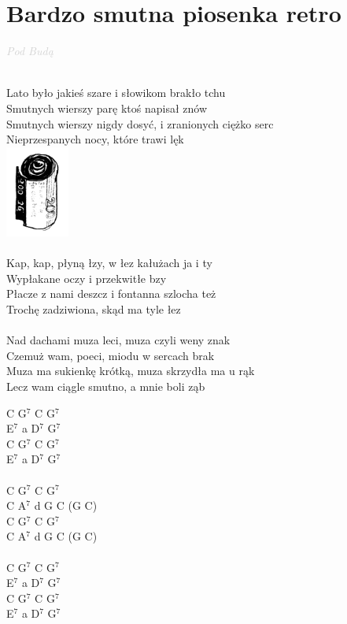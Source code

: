 \documentclass[a5paper, 10pt]{book}
\begin{document}
\newpage
\section{Bardzo smutna piosenka retro}\textcolor{lightgray}{\textit{Pod Budą}}\\~\\
\begin{minipage}[t]{0.8\textwidth}
Lato było jakieś szare i słowikom brakło tchu\\
Smutnych wierszy parę ktoś napisał znów\\
Smutnych wierszy nigdy dosyć, i zranionych ciężko serc\\
Nieprzespanych nocy, które trawi lęk\\
\includegraphics[height=3cm,right]{images/bardzo_smutna_piosenka.png}\vspace*{-31mm}\\
\\
\hspace*{5mm}Kap, kap, płyną łzy, w łez kałużach ja i ty\\
\hspace*{5mm}Wypłakane oczy i przekwitłe bzy\\
\hspace*{5mm}Płacze z nami deszcz i fontanna szlocha też\\
\hspace*{5mm}Trochę zadziwiona, skąd ma tyle łez\\
\\
Nad dachami muza leci, muza czyli weny znak\\
Czemuż wam, poeci, miodu w sercach brak\\
Muza ma sukienkę krótką, muza skrzydła ma u rąk\\
Lecz wam ciągle smutno, a mnie boli ząb\\
\end{minipage}
\begin{minipage}[t]{0.2\textwidth}
C G$^7$ C G$^7$\\
E$^7$ a D$^7$ G$^7$\\
C G$^7$ C G$^7$\\
E$^7$ a D$^7$ G$^7$\\
\\
C G$^7$ C G$^7$\\
C A$^7$ d G C (G C)\\
C G$^7$ C G$^7$\\
C A$^7$ d G C (G C)\\
\\
C G$^7$ C G$^7$\\
E$^7$ a D$^7$ G$^7$\\
C G$^7$ C G$^7$\\
E$^7$ a D$^7$ G$^7$\\
\end{minipage}
\end{document}
